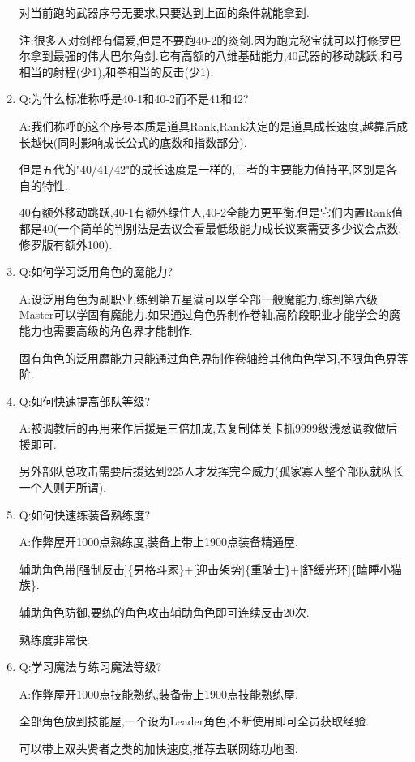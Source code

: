 \begin{enumerate}
	对当前跑的武器序号无要求,只要达到上面的条件就能拿到.

	注:很多人对剑都有偏爱,但是不要跑40-2的炎剑.因为跑完秘宝就可以打修罗巴尔拿到最强的伟大巴尔角剑.它有高额的八维基础能力,40武器的移动跳跃,和弓相当的射程(少1),和拳相当的反击(少1).

	\item
	Q:为什么标准称呼是40-1和40-2而不是41和42?

	A:我们称呼的这个序号本质是道具Rank,Rank决定的是道具成长速度,越靠后成长越快(同时影响成长公式的底数和指数部分).

	但是五代的"40/41/42"的成长速度是一样的,三者的主要能力值持平,区别是各自的特性.

	40有额外移动跳跃,40-1有额外绿住人,40-2全能力更平衡.但是它们内置Rank值都是40(一个简单的判别法是去议会看最低级能力成长议案需要多少议会点数,修罗版有额外100).


	\item
	Q:如何学习泛用角色的魔能力?

	A:设泛用角色为副职业,练到第五星满可以学全部一般魔能力,练到第六级Master可以学固有魔能力.如果通过角色界制作卷轴,高阶段职业才能学会的魔能力也需要高级的角色界才能制作.

	固有角色的泛用魔能力只能通过角色界制作卷轴给其他角色学习,{\color{red}不限角色界等阶}.

	\item
	Q:如何快速提高部队等级?

	A:被调教后的再用来作后援是三倍加成,去复制体关卡抓9999级浅葱调教做后援即可.

	另外部队总攻击需要后援达到225人才发挥完全威力(孤家寡人整个部队就队长一个人则无所谓).

	\item
	Q:如何快速练装备熟练度?

	A:作弊屋开1000点熟练度,装备上带上1900点装备精通屋.

	辅助角色带[强制反击]\{男格斗家\}+[迎击架势]\{重骑士\}+[舒缓光环]\{瞌睡小猫族\}.

	辅助角色防御,要练的角色攻击辅助角色即可连续反击20次.

	熟练度非常快.

	\item
	Q:学习魔法与练习魔法等级?
	
	A:作弊屋开1000点技能熟练,装备带上1900点技能熟练屋.

	全部角色放到技能屋,一个设为Leader角色,不断使用即可全员获取经验.

	可以带上双头贤者之类的加快速度,推荐去联网练功地图.


\end{enumerate}
